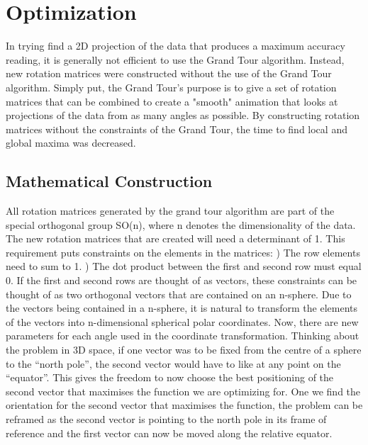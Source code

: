 \documentclass[a4paper,11pt,twoside]{article}
\begin{document}
\newpage
\section{Optimization}

In trying find a 2D projection of the data that produces a maximum accuracy reading, it is generally not efficient to use the Grand Tour algorithm. Instead, new rotation matrices were constructed without the use of the Grand Tour algorithm. Simply put, the Grand Tour's purpose is to give a set of rotation matrices that can be combined to create a "smooth" animation that looks at projections of the data from as many angles as possible. By constructing rotation matrices without the constraints of the Grand Tour, the time to find local and global maxima was decreased.

\subsection{Mathematical Construction}

All rotation matrices generated by the grand tour algorithm are part of the special orthogonal group SO(n), where n denotes the dimensionality of the data. The new rotation matrices that are created will need a determinant of 1. This requirement puts constraints on the elements in the matrices:
) The row elements need to sum to 1.
) The dot product between the first and second row must equal 0.
\newline
If the first and second rows are thought of as vectors, these constraints can be thought of as two orthogonal vectors that are contained on an n-sphere.
\newline
\newline
Due to the vectors being contained in a n-sphere, it is natural to transform the elements of the vectors into n-dimensional spherical polar coordinates. Now, there are new parameters for each angle used in the coordinate transformation. 
\newline
\newline
Thinking about the problem in 3D space, if one vector was to be fixed from the centre of a sphere to the “north pole”, the second vector would have to like at any point on the “equator”. This gives the freedom to now choose the best positioning of the second vector that maximises the function we are optimizing for. One we find the orientation for the second vector that maximises the function, the problem can be reframed as the second vector is pointing to the north pole in its frame of reference and the first vector can now be moved along the relative equator.
\end{document}
